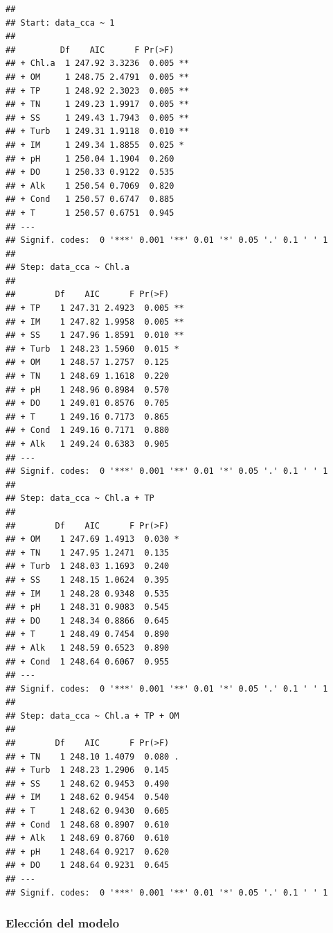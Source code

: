 \documentclass[
]{book}
\begin{document}
\begin{verbatim}
## 
## Start: data_cca ~ 1 
## 
##         Df    AIC      F Pr(>F)   
## + Chl.a  1 247.92 3.3236  0.005 **
## + OM     1 248.75 2.4791  0.005 **
## + TP     1 248.92 2.3023  0.005 **
## + TN     1 249.23 1.9917  0.005 **
## + SS     1 249.43 1.7943  0.005 **
## + Turb   1 249.31 1.9118  0.010 **
## + IM     1 249.34 1.8855  0.025 * 
## + pH     1 250.04 1.1904  0.260   
## + DO     1 250.33 0.9122  0.535   
## + Alk    1 250.54 0.7069  0.820   
## + Cond   1 250.57 0.6747  0.885   
## + T      1 250.57 0.6751  0.945   
## ---
## Signif. codes:  0 '***' 0.001 '**' 0.01 '*' 0.05 '.' 0.1 ' ' 1
## 
## Step: data_cca ~ Chl.a 
## 
##        Df    AIC      F Pr(>F)   
## + TP    1 247.31 2.4923  0.005 **
## + IM    1 247.82 1.9958  0.005 **
## + SS    1 247.96 1.8591  0.010 **
## + Turb  1 248.23 1.5960  0.015 * 
## + OM    1 248.57 1.2757  0.125   
## + TN    1 248.69 1.1618  0.220   
## + pH    1 248.96 0.8984  0.570   
## + DO    1 249.01 0.8576  0.705   
## + T     1 249.16 0.7173  0.865   
## + Cond  1 249.16 0.7171  0.880   
## + Alk   1 249.24 0.6383  0.905   
## ---
## Signif. codes:  0 '***' 0.001 '**' 0.01 '*' 0.05 '.' 0.1 ' ' 1
## 
## Step: data_cca ~ Chl.a + TP 
## 
##        Df    AIC      F Pr(>F)  
## + OM    1 247.69 1.4913  0.030 *
## + TN    1 247.95 1.2471  0.135  
## + Turb  1 248.03 1.1693  0.240  
## + SS    1 248.15 1.0624  0.395  
## + IM    1 248.28 0.9348  0.535  
## + pH    1 248.31 0.9083  0.545  
## + DO    1 248.34 0.8866  0.645  
## + T     1 248.49 0.7454  0.890  
## + Alk   1 248.59 0.6523  0.890  
## + Cond  1 248.64 0.6067  0.955  
## ---
## Signif. codes:  0 '***' 0.001 '**' 0.01 '*' 0.05 '.' 0.1 ' ' 1
## 
## Step: data_cca ~ Chl.a + TP + OM 
## 
##        Df    AIC      F Pr(>F)  
## + TN    1 248.10 1.4079  0.080 .
## + Turb  1 248.23 1.2906  0.145  
## + SS    1 248.62 0.9453  0.490  
## + IM    1 248.62 0.9454  0.540  
## + T     1 248.62 0.9430  0.605  
## + Cond  1 248.68 0.8907  0.610  
## + Alk   1 248.69 0.8760  0.610  
## + pH    1 248.64 0.9217  0.620  
## + DO    1 248.64 0.9231  0.645  
## ---
## Signif. codes:  0 '***' 0.001 '**' 0.01 '*' 0.05 '.' 0.1 ' ' 1
\end{verbatim}

\hypertarget{elecciuxf3n-del-modelo}{%
\subsubsection{Elección del modelo}\label{elecciuxf3n-del-modelo}}
\end{document}
